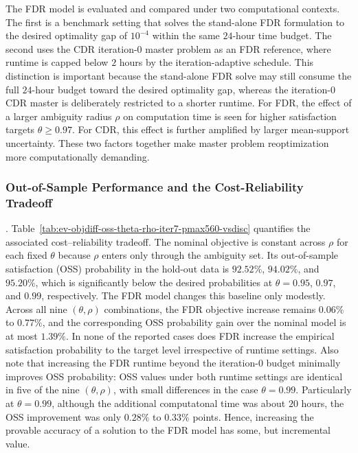 \documentclass[opre,sglanonrev]{informs4}
\begin{document}
{The FDR model is evaluated and compared under two computational contexts. The first is a
benchmark setting that solves the stand-alone FDR formulation to the desired
optimality gap of \(10^{-4}\) within the same \(24\)-hour time budget. The
second uses the CDR iteration-0 master problem as an FDR reference, where runtime
is capped below \(2\) hours by the iteration-adaptive schedule. This distinction
is important because the stand-alone FDR solve may still consume the full
\(24\)-hour budget toward the desired optimality gap, whereas the iteration-0
CDR master is deliberately restricted to a shorter runtime. For FDR, the effect
of a larger ambiguity radius \(\rho\) on computation time is seen for
higher satisfaction targets $\theta \geq 0.97$. For CDR, this effect is further amplified by larger
mean-support uncertainty. These two factors together make master problem reoptimization more computationally demanding.



\subsubsection{Out-of-Sample Performance and the Cost-Reliability Tradeoff}. 
Table~\ref{tab:ev-objdiff-oss-theta-rho-iter7-pmax560-vsdisc} quantifies the associated cost--reliability tradeoff. The nominal objective is constant across \(\rho\) for each fixed \(\theta\) because \(\rho\) enters only through the ambiguity set. Its out-of-sample satisfaction (OSS) probability in the hold-out data is \(92.52\%\), \(94.02\%\), and \(95.20\%\), which is significantly below the desired probabilities at \(\theta=0.95\), \(0.97\), and \(0.99\), respectively. The FDR model changes this baseline only modestly.  Across all nine \((\theta,\rho)\) combinations, the FDR objective increase remains \(0.06\%\) to \(0.77\%\), and the corresponding OSS probability gain over the nominal model is at most \(1.39\%\). In none of the reported cases does FDR increase the empirical satisfaction probability to the target level irrespective of runtime settings. Also note that increasing the FDR runtime beyond the iteration-0 budget minimally improves OSS probability: OSS values under both runtime settings are identical in five of the nine \((\theta,\rho)\), with small differences in the case \(\theta=0.99\). Particularly at \(\theta=0.99\), although the additional computatonal time was about \(20\) hours, the OSS improvement was only \(0.28\%\) to \(0.33\%\) points. Hence, increasing the provable accuracy of a solution to the FDR model has some, but incremental value.

}
\end{document}
